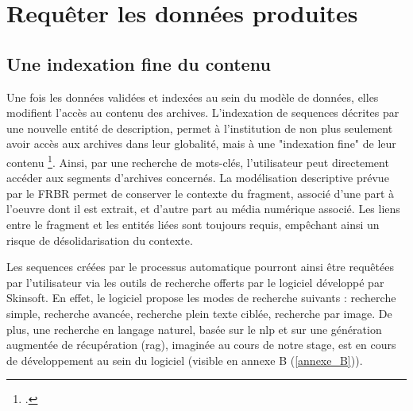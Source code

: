 \section{\label{II_3_C} Requêter les données produites} 

\subsection{Une indexation fine du contenu}
Une fois les données validées et indexées au sein du modèle de données, elles modifient l'accès au contenu des archives. L'indexation de \gls{sequence}s décrites par une nouvelle entité de description, permet à  l'institution de non plus seulement avoir accès aux archives dans leur globalité, mais à une "indexation fine" de leur contenu \footcite{bachimont2007}. Ainsi, par une recherche de mots-clés, l'utilisateur peut directement accéder aux segments d’archives concernés. La modélisation descriptive prévue par le \gls{FRBR} permet de conserver le contexte du fragment, associé d'une part à l'\gls{oeuvre} dont il est extrait, et d'autre part au média numérique associé. Les liens entre le fragment et les entités liées sont toujours requis, empêchant ainsi un risque de désolidarisation du contexte. 

Les \gls{sequence}s créées par le processus automatique pourront ainsi être requêtées par l'utilisateur via les outils de recherche offerts par le logiciel développé par Skinsoft. En effet, le logiciel propose les modes de recherche suivants : recherche simple, recherche avancée, recherche plein texte ciblée, recherche par image. De plus, une recherche en langage naturel, basée sur le \gls{nlp} et sur une génération augmentée de récupération (\gls{rag}), imaginée au cours de notre stage, est en cours de développement au sein du logiciel (visible en annexe B (\ref{annexe_B})). 

